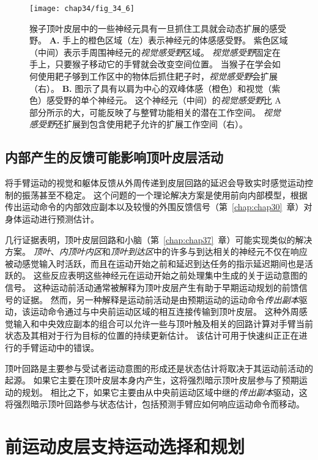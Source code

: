 \begin{figure}[htbp]
	\centering
	\texttt{[image: chap34/fig\_34\_6]}
	\caption{猴子顶叶皮层中的一些神经元具有一旦抓住工具就会动态扩展的感受野\cite{maravita2004tools}。
		\textbf{A.} 手上的橙色区域（左）表示神经元的体感感受野。
		紫色区域（中间）表示手周围神经元的\textit{视觉感受野}区域。
		\textit{视觉感受野}固定在手上，只要猴子移动它的手臂就会改变空间位置。
		当猴子在学会如何使用耙子够到工作区中的物体后抓住耙子时，\textit{视觉感受野}会扩展（右）。
		\textbf{B.} 图示了具有以肩为中心的双峰体感（橙色）和视觉（紫色）感受野的单个神经元。
		这个神经元（中间）的\textit{视觉感受野}比 A 部分所示的大，可能反映了与整臂功能相关的潜在工作空间。
		\textit{视觉感受野}还扩展到包含使用耙子允许的扩展工作空间（右）。}
	\label{fig:34_6}
\end{figure}



\subsection{内部产生的反馈可能影响顶叶皮层活动}

将手臂运动的视觉和躯体反馈从外周传递到皮层回路的延迟会导致实时感觉运动控制的振荡甚至不稳定。
这个问题的一个理论解决方案是使用前向内部模型，根据传出运动命令的内部效应副本以及较慢的外围反馈信号（第~\ref{chap:chap30}~章）对身体运动进行预测估计。


几行证据表明，顶叶皮层回路和小脑（第~\ref{chap:chap37}~章）可能实现类似的解决方案。
\textit{顶叶}、\textit{内顶叶内区}和\textit{顶叶到达区}中的许多与到达相关的神经元不仅在响应被动感觉输入时活跃，而且在运动开始之前和延迟到达任务的指示延迟期间也是活跃的。
这些反应表明这些神经元在运动开始之前处理集中生成的关于运动意图的信号。
这种运动前活动通常被解释为顶叶皮层产生有助于早期运动规划的前馈信号的证据。
然而，另一种解释是运动前活动是由预期运动的运动命令\textit{传出副本}驱动，该运动命令通过与中央前运动区域的相互连接传输到顶叶皮层。
这种外周感觉输入和中央效应副本的组合可以允许一些与顶叶触及相关的回路计算对手臂当前状态及其相对于行为目标的位置的持续更新估计。
该估计可用于快速纠正正在进行的手臂运动中的错误。


顶叶回路是主要参与受试者运动意图的形成还是状态估计将取决于其运动前活动的起源。
如果它主要在顶叶皮层本身内产生，这将强烈暗示顶叶皮层参与了预期运动的规划。
相比之下，如果它主要由从中央前运动区域中继的\textit{传出副本}驱动，这将强烈暗示顶叶回路参与状态估计，包括预测手臂应如何响应运动命令而移动。



\section{前运动皮层支持运动选择和规划}

